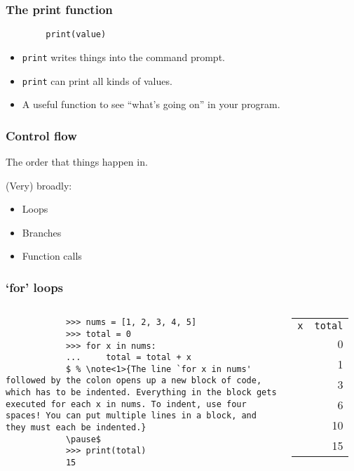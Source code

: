 \documentclass[notes]{beamer}
\begin{document}
	\begin{frame}[fragile]
		\frametitle{The print function}
		\begin{lstlisting}
		print(value)
		\end{lstlisting}
		\begin{itemize}
			\item \lstinline|print| writes things into the command prompt.
			\pause
			\item \lstinline|print| can print all kinds of values.
			\pause
			\item A useful function to see ``what's going on'' in your program.
		\end{itemize}
	\end{frame}
	
	\begin{frame}[fragile]
		\frametitle{Control flow}
		The order that things happen in.

		\pause

		(Very) broadly:
		\begin{itemize}
			\item Loops
			\item Branches
			\item Function calls
		\end{itemize}

	\end{frame}

	\begin{frame}[fragile]
		\frametitle{`for' loops}
		
		\begin{columns}[c]
			\begin{lstlisting}
			>>> nums = [1, 2, 3, 4, 5]
			>>> total = 0
			>>> for x in nums:
			...     total = total + x
			$ % \note<1>{The line `for x in nums' followed by the colon opens up a new block of code, which has to be indented. Everything in the block gets executed for each x in nums. To indent, use four spaces! You can put multiple lines in a block, and they must each be indented.}
			\pause$
			>>> print(total)
			15
			\end{lstlisting}
			
			\pause
			\begin{tabular}{l | r}
				\lstinline|x| & \lstinline|total| \\
				\, & 0 \\ \pause
				1 & 1 \\ \pause
				2 & 3 \\ \pause
				3 & 6 \\ \pause
				4 & 10 \\ \pause
				5 & 15 \\
			\end{tabular}
		\end{columns}
		
		
	\end{frame}
	
\end{document}
